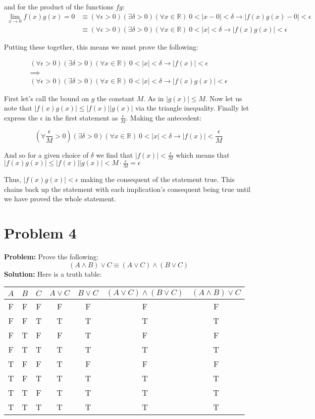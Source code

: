 \documentclass{article}
\begin{document}
and for the product of the functions $fg$:
\begin{align*}
\lim_{x\to 0}f(x)g(x)=0&\equiv(\forall\epsilon>0)(\exists\delta>0)(\forall x\in\mathbb R)\ 0<|x-0|<\delta\rightarrow|f(x)g(x)-0|<\epsilon\\
&\equiv(\forall\epsilon>0)(\exists\delta>0)(\forall x\in\mathbb R)\ 0<|x|<\delta\rightarrow|f(x)g(x)|<\epsilon
\end{align*}

Putting these together, this means we must prove the following:

\begin{gather*}
  (\forall\epsilon>0)(\exists\delta>0)(\forall x\in\mathbb R)\ 0<|x|<\delta\rightarrow|f(x)|<\epsilon\\
  \implies\\
  (\forall\epsilon>0)(\exists\delta>0)(\forall x\in\mathbb R)\ 0<|x|<\delta\rightarrow|f(x)g(x)|<\epsilon
\end{gather*}

First let's call the bound on $g$ the constant $M$. As in $|g(x)|\le M$. Now let us note that $|f(x)g(x)|\le|f(x)||g(x)|$ via the triangle inequality. Finally let express the $\epsilon$ in the first statement as $\frac{\epsilon}{M}$. Making the antecedent:

$$(\forall\frac{\epsilon}{M}>0)(\exists\delta>0)(\forall x\in\mathbb R)\ 0<|x|<\delta\rightarrow|f(x)|<\frac{\epsilon}{M}$$

And so for a given choice of $\delta$ we find that $|f(x)|<\frac{\epsilon}{M}$ which means that $|f(x)g(x)|\le|f(x)||g(x)|< M\cdot\frac{\epsilon}{M}=\epsilon$


Thus, $|f(x)g(x)|<\epsilon$ making the consequent of the statement true. This chains back up the statement with each implication's consequent being true until we have proved the whole statement.

\section*{Problem 4}
\textbf{Problem:} Prove the following:
$$(A \wedge B)\vee C\equiv(A\vee C)\wedge(B\vee C)$$
\textbf{Solution:} Here is a truth table:
\begin{center}
\begin{tabular}{ccccccc}
$A$ & $B$ & $C$ & $A\vee C$ & $B\vee C$ & $(A\vee C)\wedge(B\vee C)$ & $(A \wedge B)\vee C$\\
\midrule
\hline
F&F&F&F&F&F&F\\
F&F&T&T&T&T&T\\
F&T&F&F&T&F&F\\
F&T&T&T&T&T&T\\
T&F&F&T&F&F&F\\
T&F&T&T&T&T&T\\
T&T&F&T&T&T&T\\
T&T&T&T&T&T&T\\
\end{tabular}
\end{center}
\end{document}
